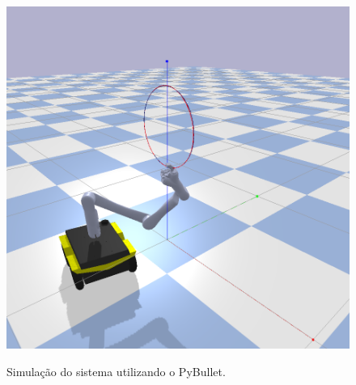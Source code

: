 \begin{figure}[ht]
\begin{minipage}[t]{0.3\linewidth}
		\label{fig:jjsim1-2}
	\end{minipage}
	\hfill
	\begin{minipage}[t]{0.3\linewidth}
		\includegraphics[width=1\textwidth]{images/jjsim1-3.png}
		\label{fig:jjsim1-3}
	\end{minipage}  
	\caption{Simulação do sistema utilizando o PyBullet.}
	\label{fig:jjsimula}
\end{figure}


%
%
%
%


